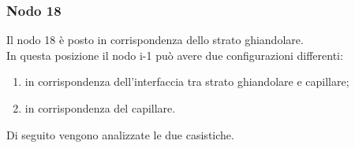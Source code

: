 
\subsubsection*{Nodo 18}
Il nodo 18 è posto in corrispondenza dello strato ghiandolare.\\
In questa posizione il nodo i-1 può avere due configurazioni differenti:
\begin{enumerate}
    \item in corrispondenza dell'interfaccia tra strato ghiandolare e capillare;
    \item in corrispondenza del capillare.
\end{enumerate}
Di seguito vengono analizzate le due casistiche.
